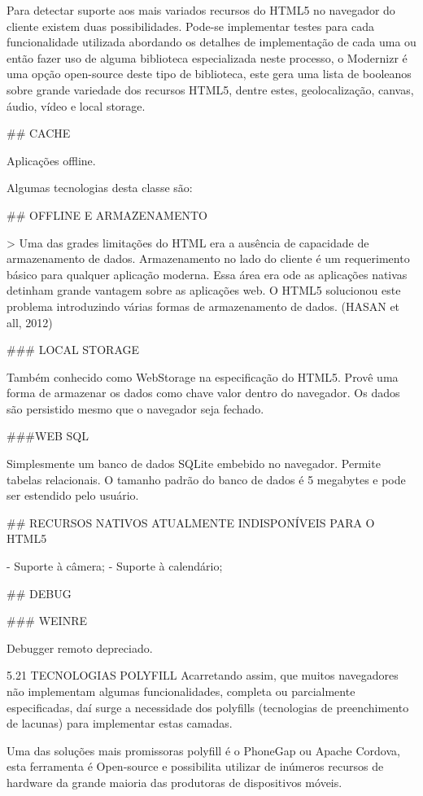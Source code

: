 \documentclass[11pt,a4paper]{article}
\begin{document}
Para detectar suporte aos mais variados recursos do HTML5 no navegador do cliente existem duas possibilidades. Pode-se implementar testes para cada funcionalidade utilizada abordando os detalhes de implementação de cada uma ou então fazer uso de alguma biblioteca especializada neste processo, o Modernizr é uma opção open-source deste tipo de biblioteca, este gera uma lista de booleanos sobre grande variedade dos recursos HTML5, dentre estes, geolocalização, canvas, áudio, vídeo e local storage.

## CACHE

Aplicações offline.

Algumas tecnologias desta classe são:

## OFFLINE E ARMAZENAMENTO

> Uma das grades limitações do HTML era a ausência de capacidade de armazenamento de dados. Armazenamento no lado do cliente é um requerimento básico para qualquer aplicação moderna. Essa área era ode as aplicações nativas detinham grande vantagem sobre as aplicações web. O HTML5 solucionou este problema introduzindo várias formas de armazenamento de dados. (HASAN et all, 2012)

### LOCAL STORAGE

Também conhecido como WebStorage na especificação do HTML5. Provê uma forma de armazenar os dados como chave valor dentro do navegador. Os dados são persistido mesmo que o navegador seja fechado.

###WEB SQL

Simplesmente um banco de dados SQLite embebido no navegador. Permite tabelas relacionais. O tamanho padrão do banco de dados é 5 megabytes e pode ser estendido pelo usuário.

## RECURSOS NATIVOS ATUALMENTE INDISPONÍVEIS PARA O HTML5

- Suporte à câmera;
- Suporte à calendário;

## DEBUG

### WEINRE

Debugger remoto depreciado.

 5.21  TECNOLOGIAS POLYFILL
Acarretando assim, que muitos navegadores não implementam algumas funcionalidades, completa ou parcialmente especificadas, daí surge a necessidade dos polyfills (tecnologias de preenchimento de lacunas) para implementar estas camadas.

Uma das soluções mais promissoras polyfill é o PhoneGap ou Apache Cordova, esta ferramenta é Open-source e possibilita utilizar de inúmeros recursos de hardware da grande maioria das produtoras de dispositivos móveis.
\end{document}
